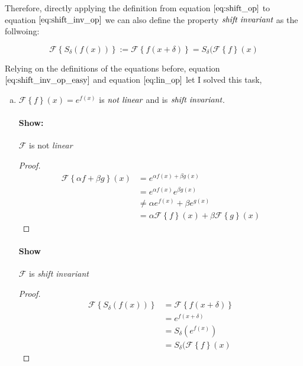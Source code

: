 \documentclass{paper}
\begin{document}
Therefore, directly applying the definition from equation $\ref{eq:shift_op}$ to equation $\ref{eq:shift_inv_op}$ we can also define the property $\emph{shift invariant}$ as the follwoing:

\begin{equation}
    \mathcal{F} \left \{S_\delta (f(x)) \right\} := \mathcal{F} \left\{ f(x+\delta) \right\} = S_\delta(\mathcal{F}\left \{f \right\}(x)
\label{eq:shift_inv_op_easy}
\end{equation}

Relying on the definitions of the equations before, equation $\ref{eq:shift_inv_op_easy}$ and equation $\ref{eq:lin_op}$ let I solved this task,

\begin{enumerate}[(a)] 

\item $\mathcal{F} \left \{ f \right\} (x) = e^{f(x)}$ is $\emph{not linear}$ and is $\emph{shift invariant}$. 

\paragraph{Show:} $\mathcal{F}$ is not \emph{linear} \\
\begin{proof}
\begin{align*}
    \mathcal{F} \left \{\alpha f + \beta g \right\}(x) 
    &= e^{\alpha f(x) + \beta g(x)} \\
    &= e^{\alpha f(x)} e^{\beta g(x)}\\
    &\neq \alpha e^{f(x)} + \beta e^{g(x)}\\
    &= \alpha \mathcal{F} \left \{f\right\}(x) + \beta \mathcal{F} \left \{g \right\}(x)
\end{align*}
\end{proof}

\paragraph{Show} $\mathcal{F}$ is \emph{shift invariant} \\
\begin{proof}
\begin{align*}
    \mathcal{F} \left \{S_\delta (f(x)) \right\} 
    &= \mathcal{F} \left\{ f(x+\delta) \right\} \\
    &= e^{f(x + \delta)} \\
    &= S_{\delta}(e^{f(x)}) \\
    &= S_\delta(\mathcal{F}\left \{f \right\}(x)
\end{align*}
\end{proof}



\end{enumerate}
\end{document}
